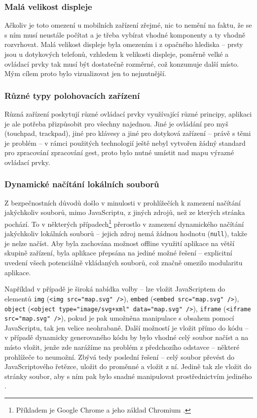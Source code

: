 \subsubsection{Malá velikost displeje}
Ačkoliv je toto omezení u mobilních zařízení zřejmé, nic to nemění na faktu, že se s ním musí neustále počítat a je třeba vybírat vhodné komponenty a ty vhodně rozvrhovat. Malá velikost displeje byla omezením i z opačného hlediska -- prsty jsou u dotykových telefonů, vzhledem k velikosti displeje, poměrně velké a ovládací prvky tak musí být dostatečně rozměrné, což konzumuje další místo. Mým cílem proto bylo vizualizovat jen to nejnutnější.

\subsubsection{Různé typy polohovacích zařízení}
Různá zařízení poskytují různé ovládací prvky využívající různé principy, aplikaci je ale potřeba přizpůsobit pro všechny najednou. Jiné je ovládání pro myš (touchpad, trackpad), jiné pro klávesy a jiné pro dotyková zařízení -- právě s těmi je problém -- v rámci použitých technologií ještě nebyl vytvořen žádný standard pro zpracování zpracování gest, proto bylo nutné umístit nad mapu výrazné ovládací prvky.

\subsubsection{Dynamické načítání lokálních souborů}
Z bezpečnostních důvodů došlo v minulosti v prohlížečích k zamezení načítání jakýchkoliv souborů, mimo JavaScriptu, z jiných zdrojů, než ze kterých stránka pochází. To v některých případech\footnote{Příkladem je Google Chrome a jeho základ Chromium \cite{BugChromeOrigin}.} přerostlo v zamezení dynamického načítání jakýchkoliv lokálních souborů -- jejich zdroj nemá žádnou hodnotu (\texttt{null}), takže je nelze načíst. Aby byla zachována možnost offline využití aplikace na větší skupině zařízení, byla aplikace přepsána na jediné možné řešení -- explicitní uvedení všech potenciálně vkládaných souborů, což značně omezilo modularitu aplikace.

Například v případě  je široká nabídka volby -- lze vložit JavaScriptem do elementů \texttt{img} (\texttt{<img src="map.svg"\ />}), \texttt{embed} (\texttt{<embed src="map.svg"\ />}), \texttt{object} (\texttt{<object type="image/svg+xml"\ data="map.svg"\ />}), \texttt{iframe} (\texttt{<iframe src="map.svg"\ />}), pokud je pak umožněna manipulace s obsahem pomocí JavaScriptu, tak jen velice neohrabaně. Další možností je vložit  přímo do  kódu -- v případě dynamicky generovaného kódu by bylo vhodné celý soubor načíst a na místo vložit, jenže zde narážíme na problém z předchozího odstavce -- některé prohlížeče to neumožní. Zbývá tedy poslední řešení -- celý soubor převést do JavaScriptového řetězce, uložit do proměnné a vložit z ní. Jedině tak zle vložit do stránky  soubor, aby s ním pak bylo snadné manipulovat prostřednictvím jediného .

